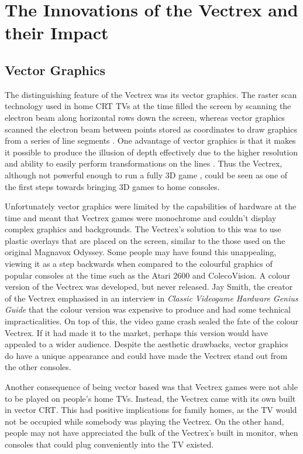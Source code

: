\documentclass{scrartcl}
\begin{document}
\section*{The Innovations of the Vectrex and their Impact}

\subsection*{Vector Graphics}
The distinguishing feature of the Vectrex was its vector graphics. The raster scan technology used in home CRT TVs at the time filled the screen by scanning the electron beam along horizontal rows down the screen, whereas vector graphics scanned the electron beam between points stored as coordinates to draw graphics from a series of line segments \cite{wolf:medium}. One advantage of vector graphics is that it makes it possible to produce the illusion of depth effectively due to the higher resolution\cite{perron:theory} and ability to easily perform transformations on the lines \cite{defanti:impact}. Thus the Vectrex, although not powerful enough to run a fully 3D game \cite{perron:theory}, could be seen as one of the first steps towards bringing 3D games to home consoles.

Unfortunately vector graphics were limited by the capabilities of hardware at the time and meant that Vectrex games were monochrome and couldn't display complex graphics and backgrounds\cite{}. The Vectrex's solution to this was to use plastic overlays that are placed on the screen, similar to the those used on the original Magnavox Odyssey. Some people may have found this unappealing, viewing it as a step backwards when compared to the colourful graphics of popular consoles at the time such as the Atari 2600 and ColecoVision. A colour version of the Vectrex was developed\cite{defanti:impact}, but never released. Jay Smith, the creator of the Vectrex emphasised in an interview in \textit{Classic Videogame Hardware Genius Guide}\cite{imagine:genius} that the colour version was expensive to produce and had some technical impracticalities. On top of this, the video game crash sealed the fate of the colour Vectrex. If it had made it to the market, perhaps this version would have appealed to a wider audience. Despite the aesthetic drawbacks, vector graphics do have a unique appearance and could have made the Vectrex stand out from the other consoles. 

Another consequence of being vector based was that Vectrex games were not able to be played on people's home TVs. Instead, the Vectrex came with its own built in vector CRT\cite{vectrex:manual}. This had positive implications for family homes, as the TV would not be occupied while somebody was playing the Vectrex. On the other hand, people may not have appreciated the bulk of the Vectrex's built in monitor, when consoles that could plug conveniently into the TV existed.
\end{document}
